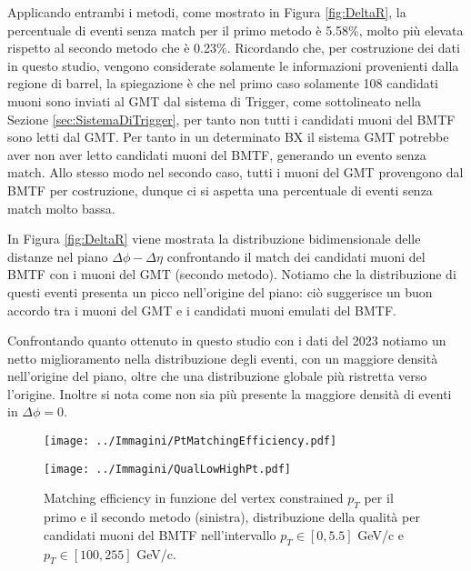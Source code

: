 Applicando entrambi i metodi, come mostrato in Figura \ref{fig:DeltaR}, la percentuale di eventi senza match per il primo metodo è 5.58\%, molto più elevata rispetto al secondo metodo che è 0.23\%. Ricordando che, per costruzione dei dati in questo studio, vengono considerate solamente le informazioni provenienti dalla regione di barrel, la spiegazione è che nel primo caso solamente 108 candidati muoni sono inviati al GMT dal sistema di Trigger, come sottolineato nella Sezione \ref{sec:SistemaDiTrigger}, per tanto non tutti i candidati muoni del BMTF sono letti dal GMT. Per tanto in un determinato BX il sistema GMT potrebbe aver non aver letto candidati muoni del BMTF, generando un evento senza match. \newline
Allo stesso modo nel secondo caso, tutti i muoni del GMT provengono dal BMTF per costruzione, dunque ci si aspetta una percentuale di eventi senza match molto bassa.

In Figura \ref{fig:DeltaR} viene mostrata la distribuzione bidimensionale delle distanze nel piano $\Delta \phi - \Delta \eta$ confrontando il match dei candidati muoni del BMTF con i muoni del GMT (secondo metodo). Notiamo che la distribuzione di questi eventi presenta un picco nell'origine del piano: ciò suggerisce un buon accordo tra i muoni del GMT e i candidati muoni emulati del BMTF.

Confrontando quanto ottenuto in questo studio con i dati del 2023 \cite{CERNsummerSchool} notiamo un netto miglioramento nella distribuzione degli eventi, con un maggiore densità nell'origine del piano, oltre che una distribuzione globale più ristretta verso l'origine. Inoltre si nota come non sia più presente la maggiore densità di eventi in $\Delta \phi = 0$.


\begin{figure}[t]
  \centering
  \begin{minipage}[b]{0.49\textwidth}
    \centering
    \texttt{[image: ../Immagini/PtMatchingEfficiency.pdf]} 
    \end{minipage}
    \hfill 
    \begin{minipage}[b]{0.46\textwidth}
      \centering
      \texttt{[image: ../Immagini/QualLowHighPt.pdf]} 
    \end{minipage}
    \caption{Matching efficiency in funzione del vertex constrained $p_T$ per il primo e il secondo metodo (sinistra), distribuzione della qualità per candidati muoni del BMTF nell'intervallo $p_T \in [0, 5.5]$ GeV/c e $p_T \in [100, 255]$ GeV/c.}
  \label{fig:MatchingEfficiecyPt}
\end{figure}

